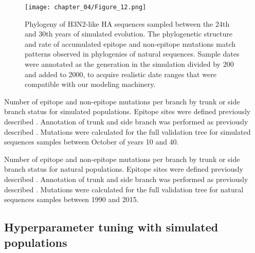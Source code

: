 \begin{figure}
  \begin{center}
  \texttt{[image: chapter\_04/Figure\_12.png]}
  \caption{
  Phylogeny of H3N2-like HA sequences sampled between the 24th and 30th years of simulated evolution.
  The phylogenetic structure and rate of accumulated epitope and non-epitope mutations match patterns observed in phylogenies of natural sequences.
  Sample dates were annotated as the generation in the simulation divided by 200 and added to 2000, to acquire realistic date ranges that were compatible with our modeling machinery.
  }
  \label{fig:simulated_h3n2_ha_phylogeny}
  \end{center}
\end{figure}

\begin{table}
  \begin{center}
    
    \caption{
    Number of epitope and non-epitope mutations per branch by trunk or side branch status for simulated populations.
    Epitope sites were defined previously described \citep{Luksza:2014hj}.
    Annotation of trunk and side branch was performed as previously described \citep{Bedford:2015fj}.
    Mutations were calculated for the full validation tree for simulated sequences samples between October of years 10 and 40.
    }
    \label{table:mutations_by_trunk_status_for_simulated_populations}
  \end{center}
\end{table}

\begin{table}
  \begin{center}
    
    \caption{
    Number of epitope and non-epitope mutations per branch by trunk or side branch status for natural populations.
    Epitope sites were defined previously described \citep{Luksza:2014hj}.
    Annotation of trunk and side branch was performed as previously described \citep{Bedford:2015fj}.
    Mutations were calculated for the full validation tree for natural sequences samples between 1990 and 2015.
    }
    \label{table:mutations_by_trunk_status}
  \end{center}
\end{table}

\subsection*{Hyperparameter tuning with simulated populations}


